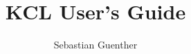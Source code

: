 \documentclass[english]{book}
\begin{document}
\author{Sebastian Guenther}
\title{KCL User's Guide}
\maketitle
\tableofcontents



\end{document}
